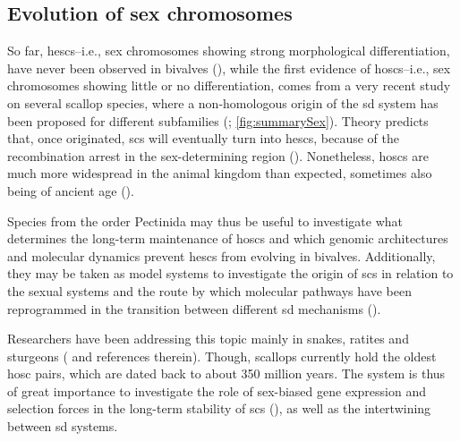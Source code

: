 \subsection{Evolution of sex chromosomes}
So far, \glspl{hesc}--i.e., sex chromosomes showing strong morphological differentiation, have never been observed in bivalves (), while the first evidence of \glspl{hosc}--i.e., sex chromosomes showing little or no differentiation, comes from a very recent study on several scallop species, where a non-homologous origin of the \gls{sd} system has been proposed for different subfamilies (; \cref{fig:summarySex}). Theory predicts that, once originated, \glspl{sc} will eventually turn into \glspl{hesc}, because of the recombination arrest in the sex-determining region (). Nonetheless, \glspl{hosc} are much more widespread in the animal kingdom than expected, sometimes also being of ancient age ().

Species from the order Pectinida may thus be useful to investigate what determines the long-term maintenance of \glspl{hosc} and which genomic architectures and molecular dynamics prevent \glspl{hesc} from evolving in bivalves. Additionally, they may be taken as model systems to investigate the origin of \glspl{sc} in relation to the sexual systems and the route by which molecular pathways have been reprogrammed in the transition between different \gls{sd} mechanisms ().

Researchers have been addressing this topic mainly in snakes, ratites and sturgeons ( and references therein). Though, scallops currently hold the oldest \gls{hosc} pairs, which are dated back to about 350 million years. The system is thus of great importance to investigate the role of sex-biased gene expression and selection forces in the long-term stability of \glspl{sc} (), as well as the intertwining between \gls{sd} systems.

